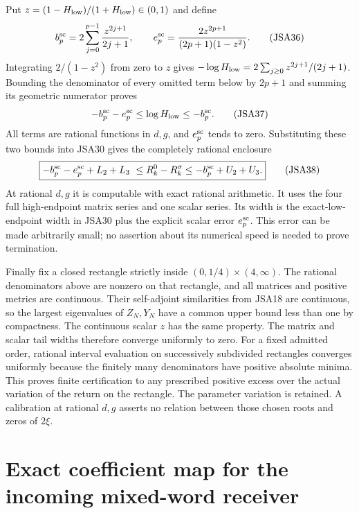 Put $z=(1-H_{\rm low})/(1+H_{\rm low})\in(0,1)$ and define
\[
 b_p^{\rm sc}=2\sum_{j=0}^{p-1}\frac{z^{2j+1}}{2j+1},\qquad
 e_p^{\rm sc}=\frac{2z^{2p+1}}{(2p+1)(1-z^2)}.
\tag{JSA36}
\]
Integrating $2/(1-z^2)$ from zero to $z$ gives
$-\log H_{\rm low}=2\sum_{j\geq0}z^{2j+1}/(2j+1)$.
Bounding the denominator of every omitted term below by
$2p+1$ and summing its geometric numerator proves
\[
 -b_p^{\rm sc}-e_p^{\rm sc}
   \leq\log H_{\rm low}\leq-b_p^{\rm sc}.
\tag{JSA37}
\]
All terms are rational functions in $d,g$, and $e_p^{\rm sc}$
tends to zero. Substituting these two bounds into JSA30 gives
the completely rational enclosure
\[
 \boxed{-b_p^{\rm sc}-e_p^{\rm sc}+L_2+L_3
 \ \leq R_k^0-R_k^\sigma\leq
 -b_p^{\rm sc}+U_2+U_3.}
\tag{JSA38}
\]
At rational $d,g$ it is computable with exact rational arithmetic.
It uses the four full high-endpoint matrix series and one scalar
series. Its width is the exact-low-endpoint width in JSA30 plus
the explicit scalar error $e_p^{\rm sc}$. This error can be made
arbitrarily small; no assertion about its numerical speed is
needed to prove termination.

Finally fix a closed rectangle strictly inside
$(0,1/4)\times(4,\infty)$. The rational denominators above are
nonzero on that rectangle, and all matrices and positive
metrics are continuous. Their self-adjoint similarities from
JSA18 are continuous, so the largest eigenvalues of $Z_N,Y_N$
have a common upper bound less than one by compactness. The
continuous scalar $z$ has the same property. The matrix and
scalar tail widths therefore converge uniformly to zero.
For a fixed admitted order, rational interval evaluation on
successively subdivided rectangles converges uniformly because
the finitely many denominators have positive absolute minima.
This proves finite certification to any prescribed positive
excess over the actual variation of the return on the rectangle.
The parameter variation is retained. A calibration at rational
$d,g$ asserts no relation between those chosen roots and zeros
of $2\xi$.

\section{Exact coefficient map for the incoming mixed-word receiver}

